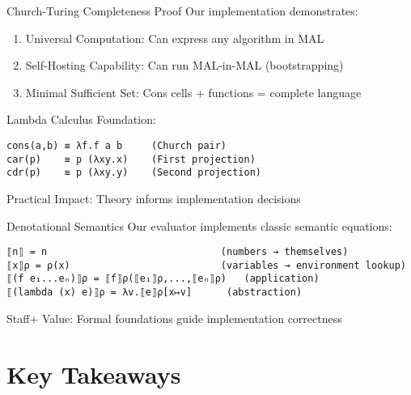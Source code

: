 \documentclass[presentation,aspectratio=169]{beamer}
\begin{document}
\begin{frame}[label={sec:org95d740c},fragile]{Church-Turing Completeness Proof}
 Our implementation demonstrates:

\begin{enumerate}
\item \alert{Universal Computation}: Can express any algorithm in MAL
\item \alert{Self-Hosting Capability}: Can run MAL-in-MAL (bootstrapping)
\item \alert{Minimal Sufficient Set}: Cons cells + functions = complete language
\end{enumerate}

\pause

\alert{Lambda Calculus Foundation}:
\begin{verbatim}
cons(a,b) ≡ λf.f a b     (Church pair)
car(p)    ≡ p (λxy.x)    (First projection)  
cdr(p)    ≡ p (λxy.y)    (Second projection)
\end{verbatim}

\pause

\alert{Practical Impact}: Theory informs implementation decisions
\end{frame}
\begin{frame}[label={sec:orge16eed2},fragile]{Denotational Semantics}
 Our evaluator implements classic semantic equations:

\begin{verbatim}
⟦n⟧ = n                              (numbers → themselves)
⟦x⟧ρ = ρ(x)                          (variables → environment lookup)  
⟦(f e₁...eₙ)⟧ρ = ⟦f⟧ρ(⟦e₁⟧ρ,...,⟦eₙ⟧ρ)   (application)
⟦(lambda (x) e)⟧ρ = λv.⟦e⟧ρ[x↦v]      (abstraction)
\end{verbatim}

\alert{Staff+ Value}: Formal foundations guide implementation correctness
\end{frame}
\section{Key Takeaways}
\label{sec:orgeefb6d0}
\end{document}
